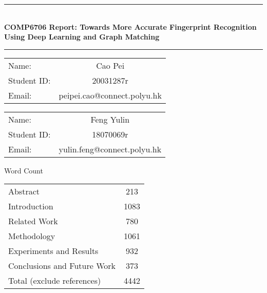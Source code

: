 \documentclass[12pt, a4paper]{article}
\newcommand{\horrule}[1]{\rule{\linewidth}{#1}}
\newcommand{\entit}{COMP6706 Report: Towards More Accurate Fingerprint Recognition Using Deep Learning and Graph Matching}
\begin{document}
\begin{titlepage}
    \begin{center}
        \horrule{0.5pt} \\ [0.4cm]
        \vspace{-1.5ex}
        { \bfseries \entit \\ \vspace{0.4cm}}
          \horrule{2pt} \vspace{-2ex}
    \end{center}

    \vspace{3cm}
    \begin{table}[h]
        \centering
        \begin{tabular}{lc}
          Name:  & {Cao Pei}            \\
          Student ID:  & {20031287r}          \\
          Email:  & {peipei.cao@connect.polyu.hk} \\
        \end{tabular}
    \end{table}

    \vspace{1cm}
    \begin{table}[h]
        \centering
        \begin{tabular}{lc}
          Name:  & {Feng Yulin}            \\
          Student ID:  & {18070069r}          \\
          Email:  & {yulin.feng@connect.polyu.hk} \\
        \end{tabular}
    \end{table}

    \vspace{3cm}
    \centering Word Count
    \begin{table}[htbp]
      \centering
      \begin{tabular}{l|c}
        \hline
        Abstract        & 213 \\
        Introduction    & 1083 \\
        Related Work    & 780 \\
        Methodology     & 1061 \\
        Experiments and Results & 932 \\
        Conclusions and Future Work & 373 \\ \hline
        Total (exclude references) & 4442 \\ \hline
      \end{tabular}
    \end{table}

\end{titlepage}
\end{document}
